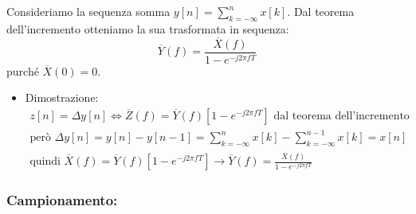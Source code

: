 \documentclass[
]{article}
\providecommand{\tightlist}{%
  \setlength{\itemsep}{0pt}\setlength{\parskip}{0pt}}
\begin{document}
\begin{enumerate}
  Consideriamo la sequenza somma
  \(\displaystyle y[n]=\sum_{k=-\infty}^{n}x[k]\). Dal teorema
  dell'incremento otteniamo la sua trasformata in sequenza: \[
  \overline{Y}(f) = \frac{\overline{X}(f)}{1-e^{-j2\pi fT}}
  \] purché \(\overline{X}(0) = 0\).

  \begin{itemize}
  \tightlist
  \item
    Dimostrazione: \begin{gather*}
    z[n] = \Delta y[n] \Longleftrightarrow \overline{Z}(f)=\overline{Y}(f)[1-e^{-j2\pi fT}] \text{ dal teorema dell'incremento} \\
    \text{però } \Delta y[n] = y[n] - y[n-1] = \sum_{k=-\infty}^{n} x[k] - \sum_{k=-\infty}^{n-1}x[k] = x[n] \\
    \text{quindi } \overline{X}(f) = \overline{Y}(f)[1-e^{-j2\pi fT}] \to \overline{Y}(f) = \frac{\overline{X}(f)}{1-e^{-j2\pi fT}}
    \end{gather*}
  \end{itemize}
\end{enumerate}

\subsubsection{Campionamento:}\label{campionamento}
\end{document}
